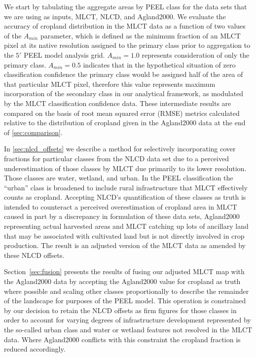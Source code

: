 We start by tabulating the aggregate areas by PEEL class for the data
sets that we are using as inputs, MLCT, NLCD, and Agland2000.  We
evaluate the accuracy of cropland distribution in the MLCT data as a
function of two values of the $A_{min}$ parameter, which is defined as
the minimum fraction of an MLCT pixel at its native resolution
assigned to the primary class prior to aggregation to the $5'$ PEEL
model analysis grid.  $A_{min}=1.0$ represents consideration of only
the primary class.  $A_{min}=0.5$ indicates that in the hypothetical
situation of zero classification confidence the primary class would be
assigned half of the area of that particular MLCT pixel, therefore
this value represents maximum incorporation of the secondary class in
our analytical framework, as modulated by the MLCT classification
confidence data.  These intermediate results are compared on the basis
of root mean squared error (RMSE) metrics calculated relative to the
distribution of cropland given in the Agland2000 data at the end of
\autoref{sec:comparison}.

In \autoref{sec:nlcd_offsets} we describe a method for selectively
incorporating cover fractions for particular classes from the NLCD
data set due to a perceived underestimation of those classes by MLCT
due primarily to its lower resolution.  Those classes are water,
wetland, and urban.  In the PEEL classification the ``urban'' class is
broadened to include rural infrastructure that MLCT effectively counts
as cropland.  Accepting NLCD's quantification of these classes as
truth is intended to counteract a perceived overestimation of cropland
area in MLCT caused in part by a discrepancy in formulation of these
data sets, Agland2000 representing actual harvested areas and MLCT
catching up lots of ancillary land that may be associated with
cultivated land but is not directly involved in crop production. The
result is an adjusted version of the MLCT data as amended by these
NLCD offsets.


Section~\ref{sec:fusion} presents the results of fusing our adjusted MLCT
map with the Agland2000 data by accepting the Agland2000 value for
cropland as truth where possible and scaling other classes
proportionally to describe the remainder of the landscape for
purposes of the PEEL model.  This operation is constrained by our
decision to retain the NLCD offsets as firm figures for those classes
in order to account for varying degrees of infrastructure development
represented by the so-called urban class and water or wetland features
not resolved in the MLCT data.  Where Agland2000 conflicts with this
constraint the cropland fraction is reduced accordingly.

